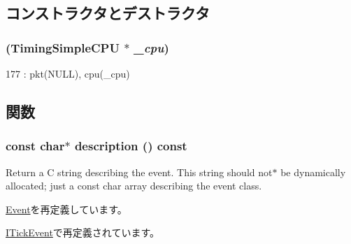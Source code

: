 \subsection{コンストラクタとデストラクタ}
\hypertarget{structTimingSimpleCPU_1_1TimingCPUPort_1_1TickEvent_a494c07ddc76dc362344524431bc0edb0}{
\subsubsection[{TickEvent}]{ ({\bf TimingSimpleCPU} $\ast$ {\em \_\-cpu})}}
\label{structTimingSimpleCPU_1_1TimingCPUPort_1_1TickEvent_a494c07ddc76dc362344524431bc0edb0}



\begin{DoxyCode}
177 : pkt(NULL), cpu(_cpu) {}
\end{DoxyCode}


\subsection{関数}
\hypertarget{structTimingSimpleCPU_1_1TimingCPUPort_1_1TickEvent_a2bd90422eece9190794479e08092a252}{
\subsubsection[{description}]{\setlength{\rightskip}{0pt plus 5cm}const char$\ast$ description () const}}
\label{structTimingSimpleCPU_1_1TimingCPUPort_1_1TickEvent_a2bd90422eece9190794479e08092a252}
Return a C string describing the event. This string should not$\ast$ be dynamically allocated; just a const char array describing the event class. 

\hyperlink{classEvent_a130ddddf003422b413e2e891b1b80e8f}{Event}を再定義しています。

\hyperlink{structTimingSimpleCPU_1_1IcachePort_1_1ITickEvent_a2bd90422eece9190794479e08092a252}{ITickEvent}で再定義されています。


